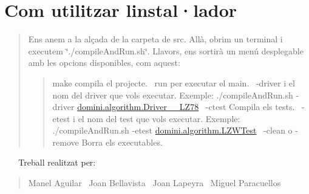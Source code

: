 \section*{Com utilitzar l\textquotesingle{}instal·lador}

\begin{quote}
Ens anem a la alçada de la carpeta de src. Allà, obrim un terminal i executem \char`\"{}./compile\+And\+Run.\+sh\char`\"{}. Llavors, ens sortirà un menú desplegable amb les opcions disponibles, com aquest\+: \begin{quote}
make compila el projecte.~\newline
 run per executar el main.~\newline
 -\/driver i el nom del driver que vols executar. Exemple\+: ./compile\+And\+Run.sh -\/driver \hyperlink{classdomini_1_1algorithm_1_1Driver____LZ78}{domini.\+algorithm.\+Driver\+\_\+\+\_\+\+L\+Z78}~\newline
 -\/ctest Compila els tests.~\newline
 -\/etest i el nom del test que vols executar. Exemple\+: ./compile\+And\+Run.sh -\/etest \hyperlink{classdomini_1_1algorithm_1_1LZWTest}{domini.\+algorithm.\+L\+Z\+W\+Test}~\newline
 -\/clean o -\/remove Borra els executables. \end{quote}
\end{quote}
~\newline
 ~\newline
 Treball realitzat per\+: \begin{quote}
Manel Aguilar~\newline
 Joan Bellavista~\newline
 Joan Lapeyra~\newline
 Miguel Paracuellos~\newline
\end{quote}
